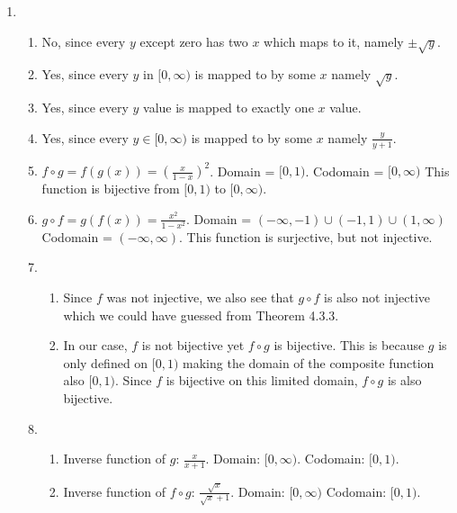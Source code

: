 \documentclass[10pt]{exam}
\begin{document}
\begin{enumerate}
    \pagebreak
    \item
    \begin{enumerate}
        \item No, since every $y$ except zero has two $x$ which maps to it, namely $\pm \sqrt{y}$. 
        \item Yes, since every $y$ in $[0, \infty)$ is mapped to by some $x$ namely $\sqrt{y}$. 
        \item Yes, since every $y$ value is mapped to exactly one $x$ value. 
        \item Yes, since every $y\in [0, \infty)$ is mapped to by some $x$ namely $\frac{y}{y+1}$.
        \item $f\circ g = f(g(x)) = (\frac{x}{1-x})^2$. Domain = $[0,1)$. Codomain = $[0, \infty)$ 
        This function is bijective from $[0, 1)$ to $[0, \infty)$. 
        \item $g\circ f = g(f(x)) = \frac{x^2}{1-x^2}$. Domain = $(-\infty, -1)\cup (-1, 1)\cup (1, \infty)$
        Codomain = $(-\infty, \infty)$. This function is surjective, but not injective. 
        \item
        \begin{enumerate}
            \item Since $f$ was not injective, we also see that $g\circ f$ is also not injective
            which we could have guessed from Theorem 4.3.3. 
            \item In our case, $f$ is not bijective yet $f\circ g$ is bijective. This is because 
            $g$ is only defined on $[0, 1)$ making the domain of the composite function also $[0, 1)$.
            Since $f$ is bijective on this limited domain, $f\circ g$ is also bijective. 
        \end{enumerate} 
        \item 
        \begin{enumerate}
            \item Inverse function of $g$: $\frac{x}{x+1}$. Domain: $[0, \infty)$. Codomain: $[0, 1)$.
            \item Inverse function of $f\circ g$: $\frac{\sqrt{x}}{\sqrt{x} + 1}$. Domain: $[0, \infty)$
            Codomain: $[0, 1)$. 
        \end{enumerate}
    \end{enumerate}
\end{enumerate}
\end{document}
